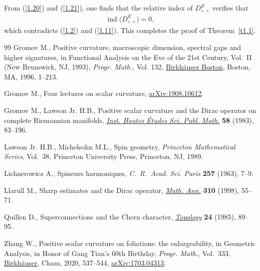 \documentclass[11pt]{article}
\numberwithin{equation}{section}
\numberwithin{equation}{section}
\theoremstyle{definition}
\begin{document}
From (\ref{1.20}) and (\ref{1.21}), one finds that the relative index of $D^E_{\varepsilon,+}$ verifies that
\begin{gather*}%
\operatorname{ind}\big(D^E_{\varepsilon,+}\big)=0,
\end{gather*}
which contradicts (\ref{1.2}) and (\ref{1.11}). This completes the proof of Theorem~\ref{t1.1}.
\begin{thebibliography}{99}
Gromov M., Positive curvature, macroscopic dimension, spectral gaps and higher
 signatures, in Functional Analysis on the Eve of the 21st Century,
 {V}ol.~{II} ({N}ew {B}runswick, {NJ}, 1993), \textit{Progr. Math.}, Vol. 132,
 \href{https://doi.org/10.1007/s10107-010-0354-x}{Birkh\"{a}user Boston}, Boston, MA, 1996, 1--213.

Gromov M., Four lectures on scalar curvature, \href{https://arxiv.org/abs/1908.10612}{arXiv:1908.10612}.

Gromov M., Lawson Jr. H.B., Positive scalar curvature and the {D}irac operator
 on complete {R}iemannian manifolds, \href{https://doi.org/10.1007/BF02953774}{\textit{Inst. Hautes \'Etudes Sci. Publ. Math.}} \textbf{58} (1983), 83--196.

Lawson Jr. H.B., Michelsohn M.L., Spin geometry, \textit{Princeton Mathematical
 Series}, Vol.~38, Princeton University Press, Princeton, NJ, 1989.

Lichnerowicz A., Spineurs harmoniques, \textit{C.~R.~Acad. Sci. Paris} \textbf{257} (1963), 7--9.

Llarull M., Sharp estimates and the {D}irac operator, \href{https://doi.org/10.1007/s002080050136}{\textit{Math. Ann.}} \textbf{310} (1998), 55--71.

Quillen D., Superconnections and the {C}hern character, \href{https://doi.org/10.1016/0040-9383(85)90047-3}{\textit{Topology}} \textbf{24} (1985), 89--95.

Zhang W., Positive scalar curvature on foliations: the enlargeability, in
 Geometric Analysis, in Honor of Gang Tian's 60th Birthday, \textit{Progr.
 Math.}, Vol.~333, \href{https://doi.org/10.1007/978-3-030-34953-0_22}{Birkh\"auser}, Cham, 2020, 537--544, \href{https://arxiv.org/abs/1703.04313}{arXiv:1703.04313}.

\end{thebibliography}
\end{document}

